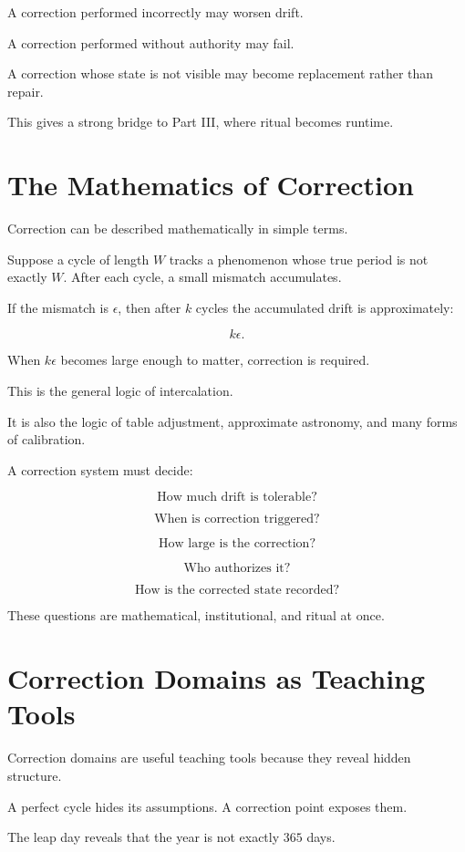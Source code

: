 \documentclass[11pt]{book}
\begin{document}
A correction performed incorrectly may worsen drift.

A correction performed without authority may fail.

A correction whose state is not visible may become replacement rather than repair.

This gives a strong bridge to Part III, where ritual becomes runtime.

\section{The Mathematics of Correction}

Correction can be described mathematically in simple terms.

Suppose a cycle of length \(W\) tracks a phenomenon whose true period is not exactly \(W\). After each cycle, a small mismatch accumulates.

If the mismatch is \(\epsilon\), then after \(k\) cycles the accumulated drift is approximately:

\[
k\epsilon.
\]

When \(k\epsilon\) becomes large enough to matter, correction is required.

This is the general logic of intercalation.

It is also the logic of table adjustment, approximate astronomy, and many forms of calibration.

A correction system must decide:

\[
\text{How much drift is tolerable?}
\]

\[
\text{When is correction triggered?}
\]

\[
\text{How large is the correction?}
\]

\[
\text{Who authorizes it?}
\]

\[
\text{How is the corrected state recorded?}
\]

These questions are mathematical, institutional, and ritual at once.

\section{Correction Domains as Teaching Tools}

Correction domains are useful teaching tools because they reveal hidden structure.

A perfect cycle hides its assumptions. A correction point exposes them.

The leap day reveals that the year is not exactly \(365\) days.
\end{document}
